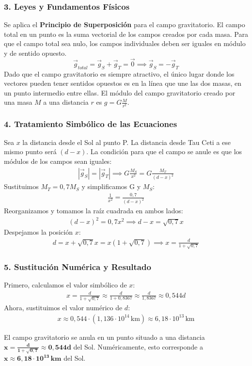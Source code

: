 \subsubsection*{3. Leyes y Fundamentos Físicos}
Se aplica el \textbf{Principio de Superposición} para el campo gravitatorio. El campo total en un punto es la suma vectorial de los campos creados por cada masa. Para que el campo total sea nulo, los campos individuales deben ser iguales en módulo y de sentido opuesto.
$$ \vec{g}_{total} = \vec{g}_S + \vec{g}_T = \vec{0} \implies \vec{g}_S = -\vec{g}_T $$
Dado que el campo gravitatorio es siempre atractivo, el único lugar donde los vectores pueden tener sentidos opuestos es en la línea que une las dos masas, en un punto intermedio entre ellas.
El módulo del campo gravitatorio creado por una masa $M$ a una distancia $r$ es $g = G \frac{M}{r^2}$.

\subsubsection*{4. Tratamiento Simbólico de las Ecuaciones}
Sea $x$ la distancia desde el Sol al punto P. La distancia desde Tau Ceti a ese mismo punto será $(d-x)$. La condición para que el campo se anule es que los módulos de los campos sean iguales:
\begin{gather}
    |\vec{g}_S| = |\vec{g}_T| \implies G \frac{M_S}{x^2} = G \frac{M_T}{(d-x)^2}
\end{gather}
Sustituimos $M_T = 0,7 M_S$ y simplificamos G y $M_S$:
\begin{gather}
    \frac{1}{x^2} = \frac{0,7}{(d-x)^2}
\end{gather}
Reorganizamos y tomamos la raíz cuadrada en ambos lados:
\begin{gather}
    (d-x)^2 = 0,7 x^2 \implies d-x = \sqrt{0,7} x
\end{gather}
Despejamos la posición $x$:
\begin{gather}
    d = x + \sqrt{0,7} x = x(1 + \sqrt{0,7}) \implies x = \frac{d}{1+\sqrt{0,7}}
\end{gather}

\subsubsection*{5. Sustitución Numérica y Resultado}
Primero, calculamos el valor simbólico de $x$:
\begin{gather}
    x = \frac{d}{1+\sqrt{0,7}} \approx \frac{d}{1+0,8367} \approx \frac{d}{1,8367} \approx 0,544 d
\end{gather}
Ahora, sustituimos el valor numérico de $d$:
\begin{gather}
    x \approx 0,544 \cdot (1,136 \cdot 10^{14} \, \text{km}) \approx 6,18 \cdot 10^{13} \, \text{km}
\end{gather}
\begin{cajaresultado}
El campo gravitatorio se anula en un punto situado a una distancia $\boldsymbol{x = \frac{d}{1+\sqrt{0,7}} \approx 0,544d}$ del Sol.
Numéricamente, esto corresponde a $\boldsymbol{x \approx 6,18 \cdot 10^{13} \, \textbf{km}}$ del Sol.
\end{cajaresultado}

